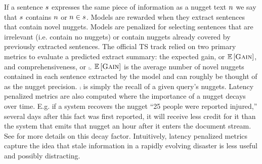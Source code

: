 If a sentence $s$ 
expresses the same piece of information as a nugget text $n$ 
we say that $s$ contains $n$ or $n \in s$.
Models are rewarded when they extract sentences that contain 
novel nuggets. Models are penalized for 
selecting sentences that are irrelevant (i.e. contain no nuggets) or 
contain nuggets already covered by previously extracted sentences. 
   The official TS track relied on two primary metrics to 
evaluate a predicted extract summary: 
the expected gain, or $\mathbb{E}\left[\textsc{Gain}\right]$, and 
comprehensiveness, or $\comp$.
$\mathbb{E}\left[\textsc{Gain}\right]$ is the average number of novel nuggets contained in each
sentence extracted by the model and can roughly be thought of as the 
nugget precision. $\comp$ is simply the recall of a given query's nuggets.
% 
Latency penalized metrics are also computed where
the importance of a nugget decays over time. E.g. if a system
recovers the nugget ``25 people were reported injured,'' several days
after this fact was first reported, it will receive less credit for it
than the system that emits that nugget an hour after it enters the 
document stream. See \cite{aslam2014trec} for more details on this decay 
factor. Intuitively, latency penalized metrics capture the idea that stale
information in a rapidly evolving disaster is less useful and possibly
distracting.

